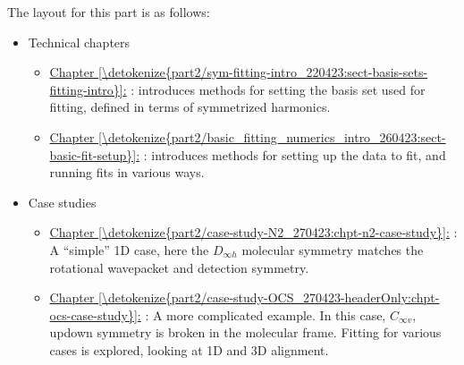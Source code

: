 \documentclass[letterpaper,table,10pt,english]{jupyterBook}
\begin{document}
\sphinxAtStartPar
The layout for this part is as follows:
\begin{itemize}
\item {} 
\sphinxAtStartPar
Technical chapters
\begin{itemize}
\item {} 
\sphinxAtStartPar
\hyperref[\detokenize{part2/sym-fitting-intro_220423:sect-basis-sets-fitting-intro}]{Chapter \ref{\detokenize{part2/sym-fitting-intro_220423:sect-basis-sets-fitting-intro}}:} {\hyperref[\detokenize{part2/sym-fitting-intro_220423:sect-basis-sets-fitting-intro}]{}}: introduces methods for setting the basis set used for fitting, defined in terms of symmetrized harmonics.

\item {} 
\sphinxAtStartPar
\hyperref[\detokenize{part2/basic_fitting_numerics_intro_260423:sect-basic-fit-setup}]{Chapter \ref{\detokenize{part2/basic_fitting_numerics_intro_260423:sect-basic-fit-setup}}:} {\hyperref[\detokenize{part2/basic_fitting_numerics_intro_260423:sect-basic-fit-setup}]{}}: introduces methods for setting up the data to fit, and running fits in various ways.

\end{itemize}

\item {} 
\sphinxAtStartPar
Case studies
\begin{itemize}
\item {} 
\sphinxAtStartPar
\hyperref[\detokenize{part2/case-study-N2_270423:chpt-n2-case-study}]{Chapter \ref{\detokenize{part2/case-study-N2_270423:chpt-n2-case-study}}:} {\hyperref[\detokenize{part2/case-study-N2_270423:chpt-n2-case-study}]{}}: A “simple” 1D case, here the \(D_{\infty h}\) molecular symmetry matches the rotational wavepacket and detection symmetry.

\item {} 
\sphinxAtStartPar
\hyperref[\detokenize{part2/case-study-OCS_270423-headerOnly:chpt-ocs-case-study}]{Chapter \ref{\detokenize{part2/case-study-OCS_270423-headerOnly:chpt-ocs-case-study}}:} {\hyperref[\detokenize{part2/case-study-OCS_270423-headerOnly:chpt-ocs-case-study}]{}}: A more complicated example. In this case, \(C_{\infty v}\), up\sphinxhyphen{}down symmetry is broken in the molecular frame. Fitting for various cases is explored, looking at 1D and 3D alignment.


\end{itemize}
\end{itemize}
\end{document}
